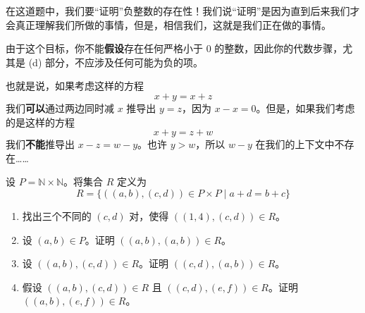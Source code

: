 \begin{exercise}
    在这道题中，我们要``证明''负整数的存在性！我们说``证明''是因为直到后来我们才会真正理解我们所做的事情，但是，相信我们，这就是我们正在做的事情。

    由于这个目标，你不能\textbf{假设}存在任何严格小于 $0$ 的整数，因此你的代数步骤，尤其是 (d) 部分，不应涉及任何可能为负的项。

    也就是说，如果考虑这样的方程
    \[x + y = x + z\]
    我们\textbf{可以}通过两边同时减 $x$ 推导出 $y = z$，因为 $x - x = 0$。但是，如果我们考虑的是这样的方程
    \[x + y = z + w\]
    我们\textbf{不能}推导出 $x - z = w - y$。也许 $y > w$，所以 $w - y$ 在我们的上下文中不存在……

    设 $P = \mathbb{N} \times \mathbb{N}$。将集合 $R$ 定义为
    \[R = \{((a, b),(c, d)) \in P \times P \mid a + d = b + c\}\]
    \begin{enumerate}[label=(\alph*)]
        \item 找出三个不同的 $(c, d)$ 对，使得 $((1, 4),(c, d)) \in R$。
        \item 设 $(a, b) \in P$。证明 $((a, b),(a, b)) \in R$。
        \item 设 $((a, b),(c, d)) \in R$。证明 $((c, d),(a, b)) \in R$。
        \item 假设 $((a, b),(c, d)) \in R$ 且 $((c, d),(e, f)) \in R$。证明 $((a, b),(e, f)) \in R$。
    \end{enumerate}
\end{exercise}